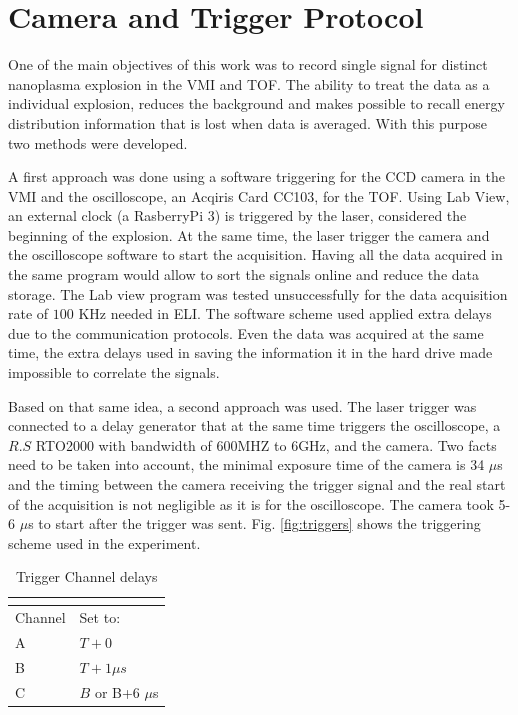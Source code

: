 \section{Camera and Trigger Protocol}

One of the main objectives of this work was to record single signal for distinct nanoplasma explosion in the VMI and TOF. The ability to treat the data as a individual explosion, reduces the background and makes possible to recall energy distribution information that is lost when data is averaged. With this purpose two methods were developed. 

A first approach was done using a software triggering for the CCD camera in the VMI and the oscilloscope, an Acqiris Card CC103, for the TOF. Using Lab View, an external clock (a RasberryPi 3) is triggered by the laser, considered the beginning of the explosion. At the same time, the laser trigger the camera and the oscilloscope software to start the acquisition. Having all the data acquired in the same program would allow to sort the signals online and reduce the data storage. The Lab view program was tested unsuccessfully for the data acquisition rate of $100$ KHz needed in ELI. The software scheme used applied extra delays due to the communication protocols. Even the data was acquired at the same time, the extra delays used in saving the information it in the hard drive made impossible to correlate the signals.

Based on that same idea, a second approach was used. The laser trigger was connected to a delay generator that at the same time triggers the oscilloscope, a $R.S$ RTO2000 with bandwidth of 600MHZ to 6GHz, and the camera. Two facts need to be taken into account, the minimal exposure time of the camera is 34 $\mu$s and the timing between the camera receiving the trigger signal and the real start of the acquisition is not negligible as it is for the oscilloscope. The camera took 5-6 $\mu$s to start after the trigger was sent. Fig. \ref{fig:triggers} shows the triggering scheme used in the experiment.


\begin{table}[t]

\centering
\begin{tabular}{ll}
\multicolumn{2}{c}{}                                          \\ \hline
\multicolumn{1}{|l|}{Channel} & \multicolumn{1}{l|}{Set to:}    \\ \hline
\multicolumn{1}{|l|}{A}                & \multicolumn{1}{l|}{$T+0$}       \\ \hline
\multicolumn{1}{|l|}{B}                & \multicolumn{1}{l|}{$T+1\mu s$}     \\ \hline
\multicolumn{1}{|l|}{C}                & \multicolumn{1}{l|}{$B$ or B+6 $\mu$s} \\ \hline
\end{tabular}
\caption[trigger Channel delays]{Trigger Channel delays}
\label{tab:delaystriger}
\end{table}

